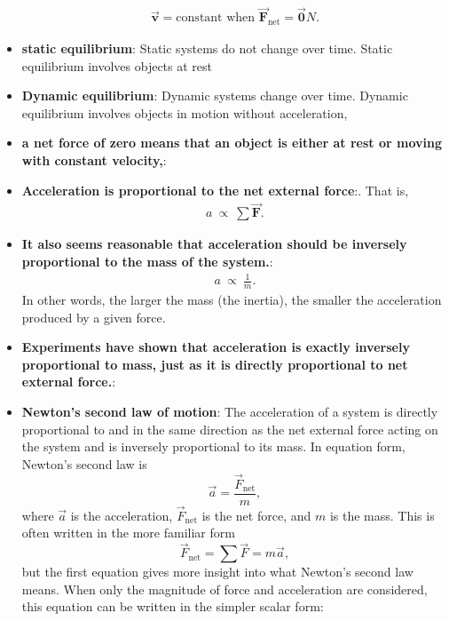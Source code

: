 \documentclass{report}
\begin{document}
\begin{itemize}
\begin{align*}
                    \vec{\mathbf{v}} = \text{constant when } \vec{\mathbf{F}}_{\text{net}} = \vec{\mathbf{0}}N
                .\end{align*}
            \item \textbf{static equilibrium}: Static systems do not change over time. Static equilibrium involves objects at rest
            \item \textbf{Dynamic equilibrium}: Dynamic systems change over time. Dynamic equilibrium involves objects in motion without acceleration,
            \item \textbf{a net force of zero means that an object is either at rest or moving with constant velocity,}:
            \item \textbf{Acceleration is proportional to the net external force}:. That is,
                \begin{align*}
                    a\ \propto\ \sum \vec{\mathbf{F}}
                .\end{align*}
            \item \textbf{It also seems reasonable that acceleration should be inversely proportional to the mass of the system.}:
                \begin{align*}
                    a\ \propto\ \frac{1}{m}
                .\end{align*}
                In other words, the larger the mass (the inertia), the smaller the acceleration produced by a given force.
            \item \textbf{Experiments have shown that acceleration is exactly inversely proportional to mass, just as it is directly proportional to net external force.}:
            \item \textbf{Newton's second law of motion}:
                The acceleration of a system is directly proportional to and in the same direction as the net external force acting on the system and is inversely proportional to its mass. In equation form, Newton's second law is
                \[
                    \vec{a} = \frac{\vec{F}_{\text{net}}}{m},
                \]
                where $\vec{a}$ is the acceleration, $\vec{F}_{\text{net}}$ is the net force, and $m$ is the mass. This is often written in the more familiar form
                \[
                    \vec{F}_{\text{net}} = \sum \vec{F} = m\vec{a},
                \]
                but the first equation gives more insight into what Newton's second law means. When only the magnitude of force and acceleration are considered, this equation can be written in the simpler scalar form:

\end{itemize}
\end{document}
